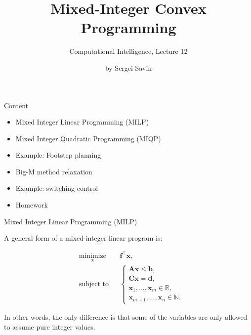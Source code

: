 \documentclass{beamer}
\title{Mixed-Integer Convex Programming}
\subtitle{Computational Intelligence, Lecture 12}
\author{by Sergei Savin}
\date{\mydate}
\begin{document}
\maketitle


\begin{frame}{Content}

\begin{itemize}
\item Mixed Integer Linear Programming (MILP)
\item Mixed Integer Quadratic Programming (MIQP)
\item Example: Footstep planning
\item Big-M method relaxation
\item Example: switching control
\item Homework
\end{itemize}

\end{frame}



\begin{frame}{Mixed Integer Linear Programming (MILP)}
\begin{flushleft}

A general form of a mixed-integer linear program is:

%
\begin{equation} \label{LP}
\begin{aligned}
& \underset{\mathbf{x}}{\text{minimize}}
& & \mathbf{f}^\top \mathbf{x}, \\
& \text{subject to}
& & \begin{cases} 
\mathbf{A} \mathbf{x}
\leq 
\mathbf{b}, \\ 
\mathbf{C}\mathbf{x} = 
\mathbf{d},  \\
\mathbf{x}_1, ..., \mathbf{x}_m \in \mathbb{R},\\
\mathbf{x}_{m+1}, ..., \mathbf{x}_n \in \mathbb{N}.
\end{cases}
%
\end{aligned}
\end{equation}
 
In other words, the only difference is that some of the variables are only allowed to assume pure integer values.
 
\end{flushleft}
\end{frame}
\end{document}
